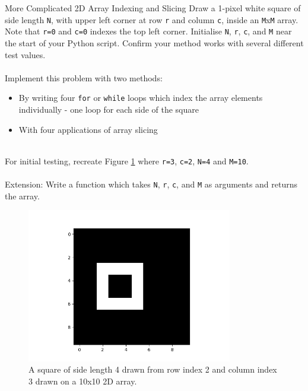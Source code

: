 \documentclass{lab}
\begin{document}
\begin{task}{More Complicated 2D Array Indexing and Slicing}{}
Draw a 1-pixel white square of side length \texttt{N}, with upper left corner at row \texttt{r} and column \texttt{c}, inside an \texttt{M}x\texttt{M} array. Note that \texttt{r=0} and \texttt{c=0} indexes the top left corner. Initialise \texttt{N}, \texttt{r}, \texttt{c}, and \texttt{M} near the start of your Python script. Confirm your method works with several different test values.
\\~\\
Implement this problem with two methods:
\begin{itemize}
	\item By writing four \texttt{for} or \texttt{while} loops which index the array elements individually - one loop for each side of the square
	\item With four applications of array slicing
\end{itemize}
~\\
For initial testing, recreate Figure \ref{fig:square} where \texttt{r=3}, \texttt{c=2}, \texttt{N=4} and \texttt{M=10}.
\\~\\
Extension: Write a function which takes \texttt{N}, \texttt{r}, \texttt{c}, and \texttt{M} as arguments and returns the array.
\begin{figure}[H]
\begin{center}
\includegraphics[width=0.8\textwidth]{square.png}
\end{center}
\caption{A square of side length 4 drawn from row index 2 and column index 3 drawn on a 10x10 2D array.}\label{fig:square}
\end{figure}
\end{task}
\end{document}
